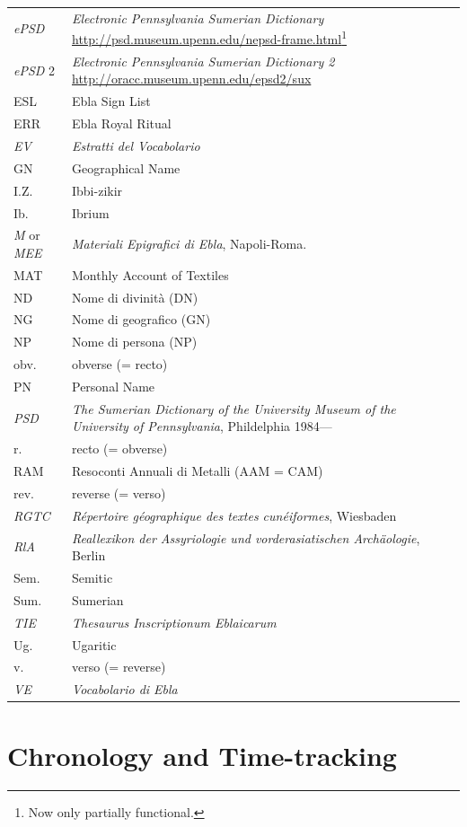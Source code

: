 \documentclass[
]{book}
\begin{document}
\begin{longtable}[]{@{}
  >{\raggedright\arraybackslash}p{}
  >{\raggedright\arraybackslash}p{}@{}}
\emph{ePSD} & \emph{Electronic Pennsylvania Sumerian Dictionary} \url{http://psd.museum.upenn.edu/nepsd-frame.html}\footnote{Now only partially functional.} \\
\emph{ePSD} 2 & \emph{Electronic Pennsylvania Sumerian Dictionary 2} \url{http://oracc.museum.upenn.edu/epsd2/sux} \\
ESL & Ebla Sign List \\
ERR & Ebla Royal Ritual \\
\emph{EV} & \emph{Estratti del Vocabolario} \\
GN & Geographical Name \\
I.Z. & Ibbi-zikir \\
Ib. & Ibrium \\
\emph{M} or \emph{MEE} & \emph{Materiali Epigrafici di Ebla}, Napoli-Roma. \\
MAT & Monthly Account of Textiles \\
ND & Nome di divinità (DN) \\
NG & Nome di geografico (GN) \\
NP & Nome di persona (NP) \\
obv. & obverse (= recto) \\
PN & Personal Name \\
\emph{PSD} & \emph{The Sumerian Dictionary of the University Museum of the University of Pennsylvania}, Phildelphia 1984--- \\
r. & recto (= obverse) \\
RAM & Resoconti Annuali di Metalli (AAM = CAM) \\
rev. & reverse (= verso) \\
\emph{RGTC} & \emph{Répertoire géographique des textes cunéiformes}, Wiesbaden \\
\emph{RlA} & \emph{Reallexikon der Assyriologie und vorderasiatischen Archäologie}, Berlin \\
Sem. & Semitic \\
Sum. & Sumerian \\
\emph{TIE} & \emph{Thesaurus Inscriptionum Eblaicarum} \\
Ug. & Ugaritic \\
v. & verso (= reverse) \\
\emph{VE} & \emph{Vocabolario di Ebla} \\
\end{longtable}

\hypertarget{chronology-and-time-tracking}{%
\chapter{Chronology and Time-tracking}\label{chronology-and-time-tracking}}
\end{document}

